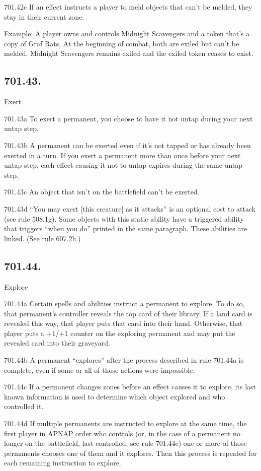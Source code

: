 701.42c If an effect instructs a player to meld objects that can’t be melded, they stay in their current zone.

Example: A player owns and controls Midnight Scavengers and a token that’s a copy of Graf Rats. At the beginning of combat, both are exiled but can’t be melded. Midnight Scavengers remains exiled and the exiled token ceases to exist.

\subsection*{701.43.}
Exert

701.43a To exert a permanent, you choose to have it not untap during your next untap step.

701.43b A permanent can be exerted even if it’s not tapped or has already been exerted in a turn. If you exert a permanent more than once before your next untap step, each effect causing it not to untap expires during the same untap step.

701.43c An object that isn’t on the battlefield can’t be exerted.

701.43d “You may exert [this creature] as it attacks” is an optional cost to attack (see rule 508.1g). Some objects with this static ability have a triggered ability that triggers “when you do” printed in the same paragraph. These abilities are linked. (See rule 607.2h.)

\subsection*{701.44.}
Explore

701.44a Certain spells and abilities instruct a permanent to explore. To do so, that permanent’s controller reveals the top card of their library. If a land card is revealed this way, that player puts that card into their hand. Otherwise, that player puts a +1/+1 counter on the exploring permanent and may put the revealed card into their graveyard.

701.44b A permanent “explores” after the process described in rule 701.44a is complete, even if some or all of those actions were impossible.

701.44c If a permanent changes zones before an effect causes it to explore, its last known information is used to determine which object explored and who controlled it.

701.44d If multiple permanents are instructed to explore at the same time, the first player in APNAP order who controls (or, in the case of a permanent no longer on the battlefield, last controlled; see rule 701.44c) one or more of those permanents chooses one of them and it explores. Then this process is repeated for each remaining instruction to explore.

